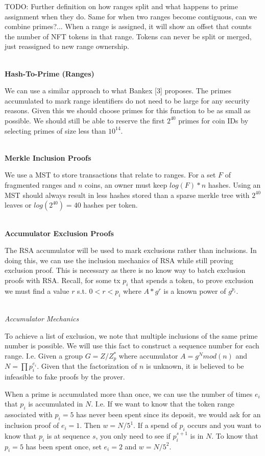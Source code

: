 \documentclass[12pt]{article}
\begin{document}
TODO: Further definition on how ranges split and what happens to prime assignment when they do. Same for when two ranges become contiguous, can we combine primes?... When a range is assigned, it will show an offset that counts the number of NFT tokens in that range. Tokens can never be split or merged, just reassigned to new range ownership.
\\
\\
\centerline{\textbf{Hash-To-Prime (Ranges)}}

We can use a similar approach to what Bankex [3] proposes. The primes accumulated to mark range identifiers do not need to be large for any security reasons. Given this we should choose primes for this function to be as small as possible. We should still be able to reserve the first $2^{40}$ primes for coin IDs by selecting primes of size less than $10^{14}$.
\\
\\
\centerline{\textbf{Merkle Inclusion Proofs}}

We use a MST to store transactions that relate to ranges. For a set $F$ of fragmented ranges and $n$ coins, an owner must keep $log(F) * n$ hashes. Using an MST should always result in less hashes stored than a sparse merkle tree with $2^{40}$ leaves or $log(2^{40}) =40$ hashes per token.
\\
\\
\centerline{\textbf{Accumulator Exclusion Proofs}}

The RSA accumulator will be used to mark exclusions rather than inclusions. In doing this, we can use the inclusion mechanics of RSA while still proving exclusion proof. This is necessary as there is no know way to batch exclusion proofs with RSA. Recall, for some tx $p_i$ that spends a token, to prove exclusion we must find a value $r$ s.t. $0 < r < p_i$ where $A * g^r$ is a known power of $g^{p_i}$.
\\
\\
\centerline{\textit{Accumulator Mechanics}}

To achieve a list of exclusion, we note that multiple inclusions of the same prime number is possible. We will use this fact to construct a sequence number for each range. I.e. Given a group $G = Z / Z_p^*$ where accumulator $A = g^N mod(n)$ and $N=\prod{p_i^{e_i}}$. Given that the factorization of $n$ is unknown, it is believed to be infeasible to fake proofs by the prover.

When a prime is accumulated more than once, we can use the number of times $e_i$ that $p_i$ is accumulated in $N$. I.e. If we want to know that the token range associated with $p_i = 5$ has never been spent since its deposit, we would ask for an inclusion proof of $e_i = 1$. Then $w = N/5^1$. If a spend of $p_i$ occurs and you want to know that $p_i$ is at sequence $s$, you only need to see if $p_i^{s+1}$ is in $N$. To know that $p_i = 5$ has been spent once, set $e_i = 2$ and $w = N/5^2$. 
\end{document}
